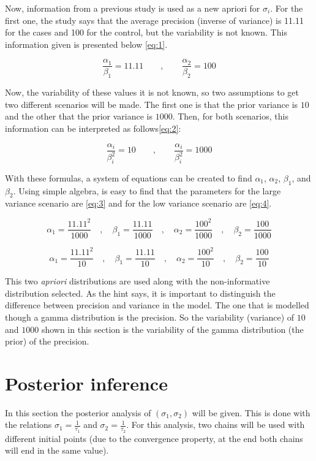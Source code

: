 \documentclass{article}
\begin{document}
Now, information from a previous study is used as a new apriori for $\sigma_i$. For the first one, the study says that the average precision (inverse of variance) is 11.11 for the cases and 100 for the control, but the variability is not known. This information given is presented below \cref{eq:1}.

\begin{equation} \label{eq:1}
\frac{\alpha_1}{\beta_1} = 11.11 \qquad,\qquad \frac{\alpha_2}{\beta_2} = 100
\end{equation}

Now, the variability of these values it is not known, so two assumptions to get two different scenarios will be made. The first one is that the prior variance is $10$ and the other that the prior variance is $1000$. Then, for both scenarios, this information can be interpreted as follows\cref{eq:2}:

\begin{equation} \label{eq:2}
\frac{\alpha_i}{\beta_i^2} = 10 \qquad,\qquad \frac{\alpha_i}{\beta_i^2} = 1000
\end{equation}

With these formulas, a system of equations can be created to find $\alpha_1$, $\alpha_2$, $\beta_1$, and $\beta_2$. Using simple algebra, is easy to find that the parameters for the large variance scenario are \cref{eq:3} and for the low variance scenario are \cref{eq:4}.

\begin{equation} \label{eq:3}
\alpha_1 = \frac{11.11^2}{1000}\quad,\quad \beta_1 = \frac{11.11}{1000}\quad,\quad \alpha_2 = \frac{100^2}{1000}\quad,\quad \beta_2 = \frac{100}{1000}
\end{equation}

\begin{equation} \label{eq:4}
\alpha_1 = \frac{11.11^2}{10}\quad,\quad \beta_1 = \frac{11.11}{10}\quad,\quad \alpha_2 = \frac{100^2}{10}\quad,\quad \beta_2 = \frac{100}{10}
\end{equation}

This two \textit{apriori} distributions are used along with the non-informative distribution selected. As the hint says, it is important to distinguish the difference between precision and variance in the model. The one that is modelled though a gamma distribution is the precision. So the variability (variance) of $10$ and $1000$ shown in this section is the variability of the gamma distribution (the prior) of the precision.

\newpage
\section{Posterior inference}
In this section the posterior analysis of $(\sigma_1, \sigma_2)$ will be given. This is done with the relations  $\sigma_1 = \frac{1}{\tau_1}$ and $\sigma_2 = \frac{1}{\tau_2}$. For this analysis, two chains will be used with different initial points (due to the convergence property, at the end both chains will end in the same value).
\end{document}
